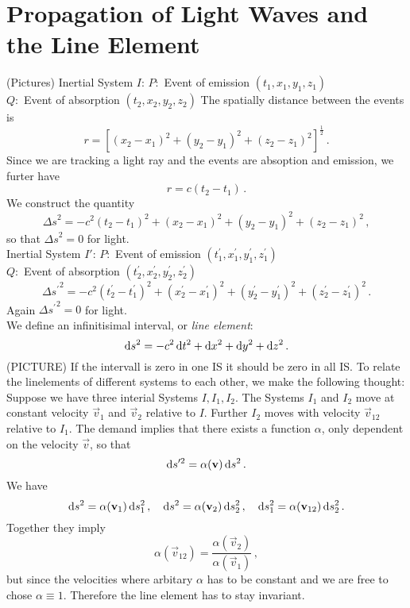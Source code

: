 \section{Propagation of Light Waves and the Line Element}
(Pictures)
Inertial System $I$:
$P:$ Event of emission $(t_1,x_1,y_1,z_1)$\\
$Q:$ Event of absorption $(t_2,x_2,y_2,z_2)$
The spatially distance between the events is
\begin{equation}
r=\left[(x_2-x_1)^2+(y_2-y_1)^2+(z_2-z_1)^2\right]^{\frac{1}{2}}\, .
\end{equation}
Since we are tracking a light ray and the events are absoption and emission, we
furter have
\begin{equation}
r=c(t_2-t_1)\, .
\end{equation}
We construct the quantity
\begin{equation}
{\Delta s}^2=-c^2(t_2-t_1)^2+(x_2-x_1)^2+(y_2-y_1)^2+(z_2-z_1)^2\, ,
\end{equation}
so that ${\Delta s}^2=0$ for light.\\
Inertial System $I'$:
$P:$ Event of emission $(t_1^\prime,x_1^\prime,y_1^\prime,z_1^\prime)$\\
$Q:$ Event of absorption $(t_2^\prime,x_2^\prime,y_2^\prime,z_2^\prime)$
\begin{equation}
{\Delta
s^\prime}^2=-c^2\left(t^\prime_2-t^\prime_1\right)^2
+\left(x^\prime_2-x^\prime_1\right)^2
+\left(y^\prime_2-y^\prime_1\right)^2
+\left(z^\prime_2-z^\prime_1\right)^2\,.
\end{equation}
Again ${\Delta s^\prime}^2=0$ for light.\\
We define an infinitisimal interval, or \emph{line element}:
\begin{equation}
\dif s^2=-c^2\dif t^2+\dif x^2+\dif y^2+\dif z^2\, .
\end{equation}
(PICTURE)
If the intervall is zero in one IS it should be zero in all IS. To relate the
linelements of different systems to each other, we make the following thought:
Suppose we have three interial Systems $I,I_1,I_2$.
The Systems $I_1$ and $I_2$ move at constant velocity $\vec{v}_1$ and $\vec{v}_2$ relative to $I$. Further
$I_2$ moves with velocity $\vec{v}_{12}$ relative to $I_1$. The demand implies
that there exists a function $\alpha$, only dependent on the velocity $\vec{v}$,
so that
\begin{equation}
\dif s'^2=\alpha(\vec{v})\dif s^2\, .
\end{equation}
We have
\begin{equation}
\dif s^2=\alpha(\vec{v}_1)\dif s_1^2\, ,\quad\dif s^2=\alpha(\vec{v}_2)\dif
s_2^2\, ,\quad\dif s_1^2=\alpha(\vec{v}_{12})\dif s_2^2\, .
\end{equation}
Together they imply
\begin{equation}
\alpha(\vec{v}_{12})=\frac{\alpha(\vec{v}_{2})}{\alpha(\vec{v}_{1})}\, ,
\end{equation}
but since the velocities where arbitary $\alpha$ has to be constant and we are
free to chose $\alpha\equiv 1$. Therefore the line element has to stay
invariant.
